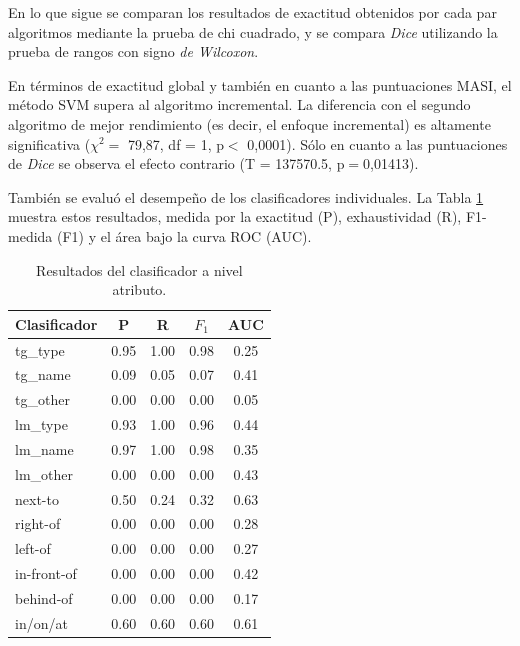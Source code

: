 

En lo que sigue se comparan los resultados de exactitud obtenidos por cada par algoritmos mediante la prueba de chi cuadrado, y se compara {\em Dice} utilizando la prueba de rangos con signo {\em de Wilcoxon}.

En t\'erminos de exactitud global y tambi\'en en cuanto a las puntuaciones MASI, el m\'etodo SVM supera al algoritmo incremental. La diferencia con el segundo algoritmo de mejor rendimiento (es decir, el enfoque incremental) es altamente significativa ($\chi^{2}=$ 79,87, df = 1, p$<$ 0,0001). S\'olo en cuanto a las puntuaciones de {\it Dice} se observa el efecto contrario (T = 137570.5, p$=$0,01413).

Tambi\'en se evalu\'o el desempe\~no de los clasificadores individuales. La Tabla \ref{tab-svm-results} muestra estos resultados, medida por la exactitud (P), exhaustividad (R), F1-medida (F1) y el \'area bajo la curva ROC (AUC).

\begin{table}[H]
\begin{center}
\footnotesize{

\begin{tabular}{l c c c c }
\hline
{{Clasificador}}	& {P} & {R} & {$F_{1}$} & {AUC} \\
\hline
{{tg\_type}} 			& 0.95 & 1.00 & 0.98 & 0.25 \\
{{tg\_name}}			& 0.09 & 0.05 & 0.07 & 0.41 \\
{{tg\_other}}			& 0.00 & 0.00 & 0.00 & 0.05 \\                               
{{lm\_type}}			& 0.93 & 1.00 & 0.96 & 0.44 \\                               
{{lm\_name}}			& 0.97 & 1.00 & 0.98 & 0.35 \\                               
{{lm\_other}}			& 0.00 & 0.00 & 0.00 & 0.43 \\                               
{{next-to}}				& 0.50 & 0.24 & 0.32 & 0.63 \\                               
{{right-of}}			& 0.00 & 0.00 & 0.00 & 0.28 \\                               
{{left-of}}				& 0.00 & 0.00 & 0.00 & 0.27 \\                               
{{in-front-of}}		& 0.00 & 0.00 & 0.00 & 0.42 \\                               
{{behind-of}}			& 0.00 & 0.00 & 0.00 & 0.17 \\                               
{{in/on/at}} 			& 0.60 & 0.60 & 0.60 & 0.61 \\                               
\hline                   
\end{tabular}
\caption{Resultados del clasificador a nivel atributo.}
\label{tab-svm-results}
}
\end{center}
\end{table}
\normalsize

